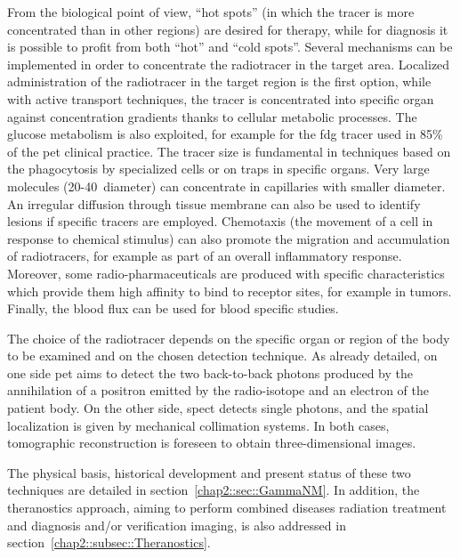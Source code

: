 From the biological point of view, \enquote{hot spots} (in which the tracer is more concentrated than in other regions) are desired for therapy, while for diagnosis it is possible to profit from both \enquote{hot} and \enquote{cold spots}. Several mechanisms can be implemented in order to concentrate the radiotracer in the target area. Localized administration of the radiotracer in the target region is the first option, while with active transport techniques, the tracer is concentrated into specific organ against concentration gradients thanks to cellular metabolic processes.  The glucose metabolism is also exploited, for example for the \gls{fdg} tracer used in 85\% of the \gls{pet} clinical practice. The tracer size is fundamental in techniques based on the phagocytosis by specialized cells or on traps in specific organs. Very large molecules (20-40~\charmum diameter) can concentrate in capillaries with smaller diameter. An irregular diffusion through tissue membrane can also be used to identify lesions if specific tracers are employed. Chemotaxis (the movement of a cell in response to chemical stimulus) can also promote the migration and accumulation of radiotracers, for example as part of an overall inflammatory response. Moreover, some radio-pharmaceuticals are produced with specific characteristics which provide them high affinity to bind to receptor sites, for example in tumors. Finally, the blood flux can be used for blood specific studies. 

The choice of the radiotracer depends on the specific organ or region of the body to be examined and on the chosen detection technique. As already detailed, on one side \gls{pet} aims to detect the two back-to-back photons produced by the annihilation of a positron emitted by the radio-isotope and an electron of the patient body. On the other side, \gls{spect} detects single photons, and the spatial localization is given by mechanical collimation systems. In both cases, tomographic reconstruction is foreseen to obtain three-dimensional images.

The physical basis, historical development and present status of these two techniques are detailed in section~\ref{chap2::sec::GammaNM}. In addition, the theranostics approach, aiming to perform combined diseases radiation treatment and diagnosis and/or verification imaging, is also addressed in section~\ref{chap2::subsec::Theranostics}.  
 
